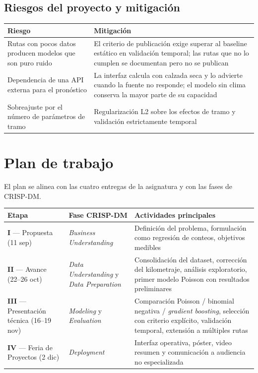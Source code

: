 \documentclass[11pt,a4paper]{article}
\begin{document}
\subsection{Riesgos del proyecto y mitigación}

\begin{center}
\begin{tabular}{p{}p{}}
\toprule
\textbf{Riesgo} & \textbf{Mitigación}\\
\midrule
Rutas con pocos datos producen modelos que son puro ruido
& El criterio de publicación exige superar al baseline estático en validación
temporal; las rutas que no lo cumplen se documentan pero no se publican\\
\addlinespace
Dependencia de una API externa para el pronóstico
& La interfaz calcula con calzada seca y lo advierte cuando la fuente no
responde; el modelo sin clima conserva la mayor parte de su capacidad\\
\addlinespace
Sobreajuste por el número de parámetros de tramo
& Regularización L2 sobre los efectos de tramo y validación estrictamente
temporal\\
\bottomrule
\end{tabular}
\end{center}

\section{Plan de trabajo}

El plan se alinea con las cuatro entregas de la asignatura y con las fases de
CRISP-DM.

\begin{center}
\begin{tabular}{p{}p{}p{}}
\toprule
\textbf{Etapa} & \textbf{Fase CRISP-DM} & \textbf{Actividades principales}\\
\midrule
\textbf{I} --- Propuesta (11 sep)
& \emph{Business Understanding}
& Definición del problema, formulación como regresión de conteos, objetivos
medibles\\
\addlinespace
\textbf{II} --- Avance (22--26 oct)
& \emph{Data Understanding} y \emph{Data Preparation}
& Consolidación del dataset, corrección del kilometraje, análisis exploratorio,
primer modelo Poisson con resultados preliminares\\
\addlinespace
\textbf{III} --- Presentación técnica (16--19 nov)
& \emph{Modeling} y \emph{Evaluation}
& Comparación Poisson / binomial negativa / \emph{gradient boosting}, selección
con criterio explícito, validación temporal, extensión a múltiples rutas\\
\addlinespace
\textbf{IV} --- Feria de Proyectos (2 dic)
& \emph{Deployment}
& Interfaz operativa, póster, video resumen y comunicación a audiencia no
especializada\\
\bottomrule
\end{tabular}
\end{center}
\end{document}
